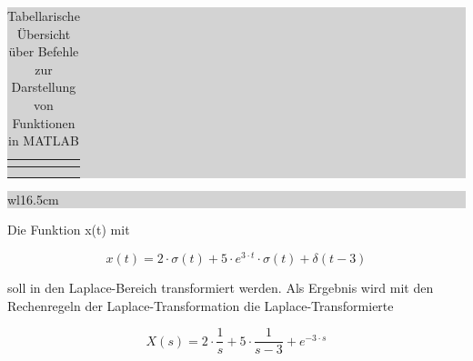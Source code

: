 \begin{table}[H]
\setlength{\arrayrulewidth}{.1em}
\caption{Tabellarische Übersicht über Befehle zur Darstellung von Funktionen in MATLAB}

\setlength{\fboxsep}{0pt}%
\colorbox{lightgray}{%
%
\begin{tabular}{| c | c |}
\hline

\parbox[c][0.3in][c]{2in}{\smallskip\centering\textbf{\selectfont{Befehl}}} & \parbox[c][0.3in][c]{4.4in}{\smallskip\centering\textbf{\selectfont{Beschreibung}}}\\ \hline

\parbox[c][0.45in][c]{2in}{} & 
\parbox[c][0.45in][c]{4.4in}{}\\
\hline

\parbox[c][0.45in][c]{2in}{} & 
\parbox[c][0.45in][c]{4.4in}{}\\
\hline

\end{tabular}%
}
\label{tab:fourseven}
\end{table}

\noindent
\colorbox{lightgray}{%
%
\renewcommand\arraystretch{0.6}%
\begin{tabular}{ wl{16.5cm} }
{\selectfont{Beispiel: Laplace-Transformation mit MATLAB} }
\end{tabular}%
}\bigskip

\noindent Die Funktion x(t) mit

\begin{equation}\label{eq:fourhundredsfiftysix}
x\left(t\right)=2\cdot \sigma \left(t\right)+5\cdot e^{3\cdot t} \cdot \sigma \left(t\right)+\delta \left(t-3\right)
\end{equation}

\noindent soll in den Laplace-Bereich transformiert werden. Als Ergebnis wird mit den Rechenregeln der Laplace-Transformation die Laplace-Transformierte 

\clearpage

\begin{equation}\label{eq:fourhundredsfiftyseven}
X(s)=2\cdot \frac{1}{s} +5\cdot \frac{1}{s-3} +e^{-3\cdot s} 
\end{equation}

